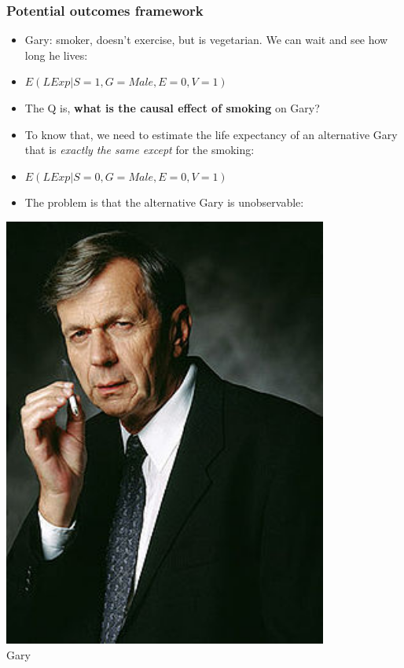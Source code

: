 \documentclass[aspectratio=43]{beamer}
\begin{document}
\begin{frame}
\frametitle{Potential outcomes framework}
\centering


\begin{minipage}{0.7\textwidth}\centering
  \begin{itemize}\linespread{2}
    \item<1-> Gary: smoker, doesn't exercise, but is vegetarian. We can wait and see how long he lives:
    \item<1->[] {\small $E(LExp|S=1, G=Male, E=0, V=1)$}
    \item<2-> The Q is, \textbf{what is the causal effect of smoking} on Gary?
    \item<3-> To know that, we need to estimate the life expectancy of an alternative Gary that is \textit{exactly the same except} for the smoking:
    \item<3->[] {\small $E(LExp|S=0, G=Male, E=0, V=1)$}
    \item<4-> The problem is that the alternative Gary is unobservable: 
  \end{itemize}
\end{minipage}\hfill
\begin{minipage}{0.3\textwidth}\centering
\includegraphics[width = 0.8\textwidth]{../img/smoking_man}\\Gary
\end{minipage}


\end{frame}
\end{document}
